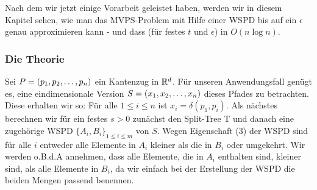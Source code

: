  Nach dem wir jetzt einige Vorarbeit geleistet haben, werden wir in diesem Kapitel sehen, wie man das MVPS-Problem mit Hilfe einer WSPD bis auf ein $\epsilon$ genau approximieren kann - und dass (für festes $t$ und $\epsilon$) in $O(n\log n)$.
    
    \subsubsection*{Die Theorie}
    Sei $P = (p_1, p_2, \mathellipsis, p_n)$ ein Kantenzug in $\mathbb{R}^d$. Für unseren Anwendungsfall genügt es, eine eindimensionale Version $S = (x_1, x_2, \mathellipsis, x_n)$ dieses Pfades zu betrachten. Diese erhalten wir so: Für alle $1 \leq i \leq n$ ist $x_i = \delta(p_1, p_i)$.
    Als nächstes berechnen wir für ein festes $s > 0$ zunächst den Split-Tree T und danach eine zugehörige WSPD $\{A_i, B_i\}_{1 \leq i \leq m}$ von $S$. Wegen Eigenschaft (3) der WSPD sind für alle $i$ entweder alle Elemente in $A_i$ kleiner als die in $B_i$ oder umgekehrt. Wir werden o.B.d.A annehmen, dass alle Elemente, die in $A_i$ enthalten sind, kleiner sind, als alle Elemente in $B_i$, da wir einfach bei der Erstellung der WSPD die beiden Mengen passend benennen.
    
